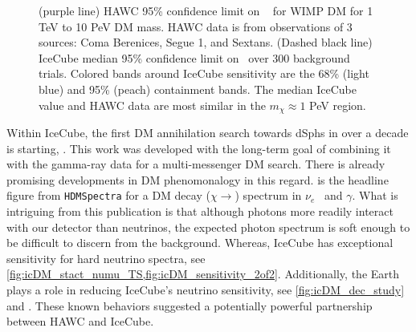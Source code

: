 \begin{figure}[t]
    \caption{(purple line) HAWC 95\% confidence limit on \sv~ for WIMP DM for 1 TeV to 10 PeV DM mass. HAWC data is from observations of 3 sources: Coma Berenices, Segue 1, and Sextans. (Dashed black line) IceCube median 95\% confidence limit on \sv~over 300 background trials. Colored bands around IceCube sensitivity are the 68\% (light blue) and 95\% (peach) containment bands. The median IceCube value and HAWC data are most similar in the $m_\chi \approx 1$ PeV region.}
    \label{fig:nuDuck_sens}
\end{figure}

Within IceCube, the first DM annihilation search towards dSphs in over a decade is starting, .
This work was developed with the long-term goal of combining it with the gamma-ray data for a multi-messenger DM search.
There is already promising developments in DM phenomonalogy in this regard.
 is the headline figure from \texttt{HDMSpectra} \cite{Rodd:HDM_spec} for a DM decay ($\chi \rightarrow$) spectrum in $\nu_e$~ and $\gamma$.
What is intriguing from this publication is that although photons more readily interact with our detector than neutrinos, the expected photon spectrum is soft enough to be difficult to discern from the background.
Whereas, IceCube has exceptional sensitivity for hard neutrino spectra, see \cref{fig:icDM_stact_numu_TS,fig:icDM_sensitivity_2of2}.
Additionally, the Earth plays a role in reducing IceCube's neutrino sensitivity, see \cref{fig:icDM_dec_study} and \cite{IC3:Earth_Attenuation}.
These known behaviors suggested a potentially powerful partnership between HAWC and IceCube.

